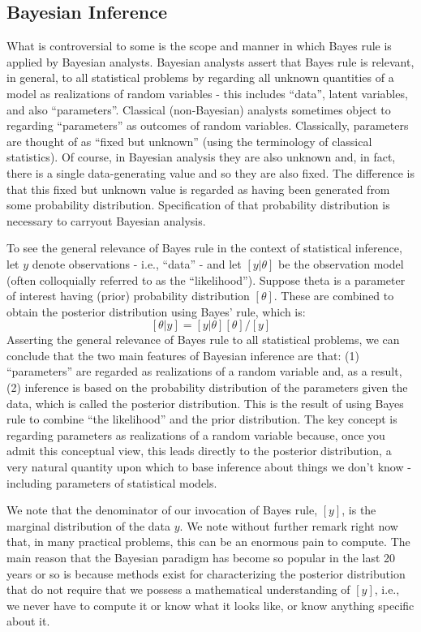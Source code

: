 \subsection{Bayesian Inference}


What is controversial to some is the scope and manner in which Bayes rule is applied by Bayesian analysts. Bayesian analysts assert that Bayes rule is relevant, in general, to all statistical problems by regarding all unknown quantities of a model as realizations of random variables - this includes ``data'', latent variables, and also ``parameters''. Classical (non-Bayesian) analysts sometimes object to regarding ``parameters'' as outcomes of random variables. Classically, parameters are thought of as ``fixed but unknown'' (using the terminology of classical statistics). Of course, in Bayesian analysis they are also unknown and, in fact, there is a single data-generating value and so they are also fixed. The difference is that this fixed but unknown value is regarded as having been generated from some probability distribution. Specification of that probability distribution is necessary to carryout Bayesian analysis.


To see the general relevance of Bayes rule in the context of statistical inference, let $y$  denote observations - i.e., ``data'' - and let $[y|\theta]$ be the observation model (often colloquially referred to as the ``likelihood'').  Suppose theta is a parameter of interest having (prior) probability distribution $[\theta]$. These are combined to obtain the posterior distribution using Bayes' rule, which is:
\[
 [\theta|y]= [y|\theta][\theta]/[y]
\]
Asserting the general relevance of Bayes rule to all statistical
problems, we can conclude that the two main features of Bayesian
inference are that: (1) ``parameters'' are regarded as realizations of
a random variable and, as a result, (2) inference is based on the
probability distribution of the parameters given the data, which is
called the posterior distribution. This is the result of using Bayes
rule to combine ``the likelihood'' and the prior distribution.  The
key concept is regarding parameters as realizations of a random
variable because, once you admit this conceptual view, this leads
directly to the posterior distribution, a very natural quantity upon
which to base inference about things we don't know -  including parameters of statistical models.  


We note that the denominator of our invocation of Bayes rule, $[y]$, is the marginal distribution of the data $y$.   We note without further remark right now that, in many practical problems, this can be an enormous pain to compute. The main reason that the Bayesian paradigm has become so popular in the last 20 years or so is because methods exist for characterizing the posterior distribution that do not require that we possess a mathematical understanding of $[y]$, i.e., we never have to compute it or know what it looks like, or know anything specific about it. 


